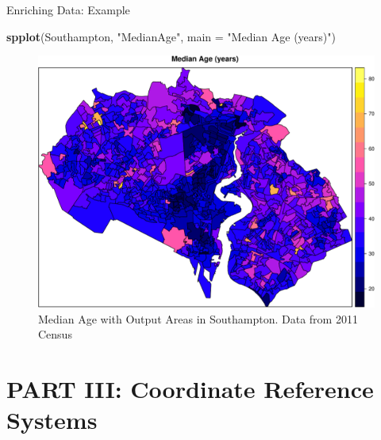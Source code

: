 \documentclass[10pt,ignorenonframetext,]{beamer}
\newenvironment{Shaded}{\begin{snugshade}}{\end{snugshade}}
\newcommand{\KeywordTok}[1]{\textcolor[rgb]{0.13,0.29,0.53}{\textbf{{#1}}}}
\newcommand{\DataTypeTok}[1]{\textcolor[rgb]{0.13,0.29,0.53}{{#1}}}
\newcommand{\StringTok}[1]{\textcolor[rgb]{0.31,0.60,0.02}{{#1}}}
\newcommand{\NormalTok}[1]{{#1}}
\begin{document}
\begin{frame}[fragile]{Enriching Data: Example}

\begin{Shaded}
\begin{Highlighting}[]
\KeywordTok{spplot}\NormalTok{(Southampton, }\StringTok{"MedianAge"}\NormalTok{, }\DataTypeTok{main =} \StringTok{"Median Age (years)"}\NormalTok{)}
\end{Highlighting}
\end{Shaded}

\begin{figure}

{\centering \includegraphics[width=0.7\linewidth]{SpatialDataLecture_files/figure-beamer/unnamed-chunk-24-1} 

}

\caption{Median Age with Output Areas in Southampton. Data from 2011 Census}\label{fig:unnamed-chunk-24}
\end{figure}

\end{frame}

\section{PART III: Coordinate Reference
Systems}\label{part-iii-coordinate-reference-systems}
\end{document}
